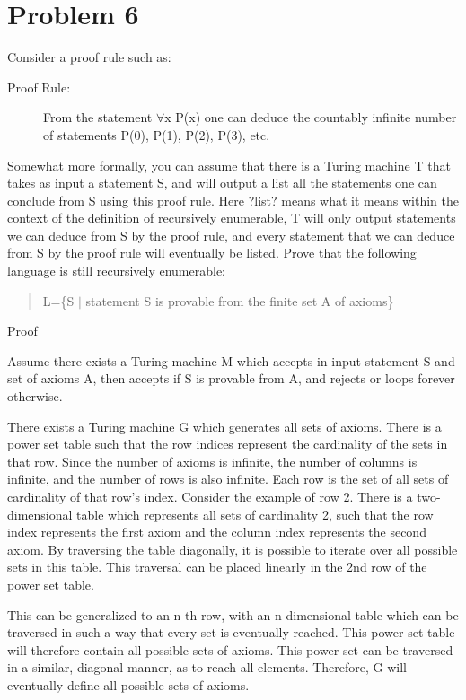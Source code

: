 \documentclass{article}
\begin{document}
\section{Problem 6}
Consider a proof rule such as:
\begin{description}
\item[Proof  Rule:] From  the  statement $\forall$x P(x) one  can  deduce  the  countably  infinite number of statements P(0), P(1), P(2), P(3), etc.
\end{description}
Somewhat more formally, you can assume that there is a Turing machine T that takes as  input  a  statement S,  and  will  output  a  list  all  the  statements  one  can  conclude from S using this proof rule.  Here ?list? means what it means within the context of the definition of recursively enumerable, T will only output statements we can deduce from S by the proof rule, and every statement that we can deduce from S by the proof rule  will  eventually  be  listed.   Prove  that  the  following  language  is  still  recursively enumerable:
\begin{quote}
L=\{S $|$ statement S is provable from the finite set A of axioms\}
\end{quote}

\begin{description}
\item[Proof]
\end{description}

Assume there exists a Turing machine M which accepts in input statement S and set of axioms A, then accepts if S is provable from A, and rejects or loops forever otherwise.  

There exists a Turing machine G which generates all sets of axioms.  There is a power set table such that the row indices represent the cardinality of the sets in that row.  Since the number of axioms is infinite, the number of columns is infinite, and the number of rows is also infinite.  Each row is the set of all sets of cardinality of that row's index.  Consider the example of row 2.  There is a two-dimensional table which represents all sets of cardinality 2, such that the row index represents the first axiom and the column index represents the second axiom.  By traversing the table diagonally, it is possible to iterate over all possible sets in this table.  This traversal can be placed linearly in the 2nd row of the power set table.  

This can be generalized to an n-th row, with an n-dimensional table which can be traversed in such a way that every set is eventually reached.  This power set table will therefore contain all possible sets of axioms.  This power set can be traversed in a similar, diagonal manner, as to reach all elements.  Therefore, G will eventually define all possible sets of axioms.
\end{document}
